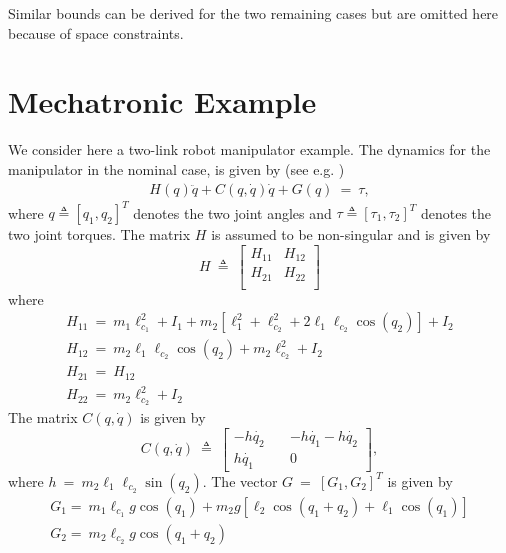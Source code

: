 \documentclass[twoside,leqno,onecolumn]{article}
\begin{document}
Similar bounds can be derived for the two remaining cases but are
omitted here because of space constraints.















\section{Mechatronic Example}
\label{sec:sim}

We consider here a two-link robot manipulator example. The
dynamics for the manipulator in the nominal case, is given by (see
e.g. \cite{Spong92})
\begin{align}
\label{eq:robot}
H(q)\ddot{q} + C(q,\dot{q})\dot{q}+ G(q)~=~\tau,
\end{align}
where $q \triangleq [q_1,q_2]^T$ denotes the two joint angles and $\tau \triangleq [\tau_1,\tau_2]^T$ denotes the two joint torques. The matrix
$H$ is assumed to be non-singular and is given by
\[ H~\triangleq~\left[ \begin{array}{ccc}
H_{11} & H_{12} \\
H_{21}& H_{22}\\
\end{array} \right]\]
where
\begin{equation}
\label{eq:robot_c}
\begin{array}{l}
\displaystyle H_{11} ~=~m_1\ell_{c_1}^2+I_1+m_2[\ell_1^2+\ell_{c_2}^2+ 2\ell_1\ell_{c_2}\cos(q_2)]+I_2 \\
\displaystyle H_{12} ~=~ m_2\ell_1\ell_{c_2}\cos(q_2)+m_2\ell_{c_2}^2+I_2\\
\displaystyle H_{21} ~=~H_{12}\\
\displaystyle H_{22} ~=~ m_2\ell_{c_2}^2+I_2
\end{array}
\end{equation}
The matrix $C(q,\dot{q})$ is given by
\[ C(q,\dot{q})~\triangleq~\left[ \begin{array}{ccc}
-h\dot{q_2} \quad& -h\dot{q_1}-h\dot{q_2} \\
h\dot{q_1}\quad&0\end{array} \right],\]
where $h~=~m_2\ell_1\ell_{c_2}\sin(q_2)$. The vector $G ~=~ [G_1,G_2]^T$ is given by
\begin{equation}
\begin{array}{l}
\displaystyle G_1 =~m_1\ell_{c_1}g\cos(q_1)+m_2 g[\ell_2\cos(q_1+q_2)+\ell_1\cos(q_1)]\\
\displaystyle G_2 =~ m_2\ell_{c_2}g\cos(q_1+q_2)
\end{array}
\label{eq:robot_g}
\end{equation}
\end{document}
